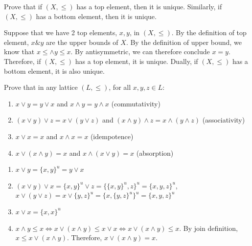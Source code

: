 \documentclass[11pt,a4paper]{exam}
\newcommand{\join}{\vee}
\newcommand{\meet}{\wedge}
\begin{document}
\begin{exo}
    Prove that if $(X, \leq)$ has a top element, then it is unique. Similarly, if $(X, \leq)$ has a bottom element, then it is unique.

    \begin{sol}
        Suppose that we have 2 top elements, $x, y$, in $(X, \leq)$. By the definition of top element, $x \& y$ are the upper bounds of $X$. By the definition of upper bound, we know that $x \leq \land y \leq x$. By antisymmetric, we can therefore conclude $x = y$. Therefore, if $(X, \leq)$ has a top element, it is unique. Dually, if $(X, \leq)$ has a bottom element, it is also unique.        
    \end{sol}
\end{exo}

\begin{exo}
    Prove that in any lattice $(L,\leq)$, for all $x,y,z \in L \colon$
    \begin{enumerate}
        \item $x \join y = y \join x$ and $x \meet y = y \meet x$ (commutativity)
        \item $(x \join y) \join z = x \join (y \join z)$ and $(x \meet y) \meet z = x \meet (y \meet z)$ (associativity)
        \item $x \join x = x$ and $x \meet x = x$ (idempotence)
        \item $x \join (x \meet y) = x$ and $x \meet (x \join y) = x$ (absorption)
    \end{enumerate}
    
    \begin{sol}
        \begin{enumerate}
            \item $x \lor y = \{x,y\}^u = y \lor x$
            \item $(x \lor y) \lor x = \{x,y\}^u \lor z = \{\{x,y\}^u, z\}^u = \{x,y,z\}^u$, $x \lor (y \lor z) = x \lor \{y,z\}^u = \{x,\{y,z\}^u\}^u=\{x,y,z\}^u$
            \item $x \lor x = \{x, x\}^u$
            \item $x \land y \leq x \Leftrightarrow x \lor (x \land y) \leq x \lor x \Leftrightarrow x \lor (x \land y) \leq x$. By join definition, $x \leq x \lor (x \land y)$. Therefore, $x \lor (x \land y) = x$.
        \end{enumerate} 
    \end{sol}
\end{exo}
\end{document}
